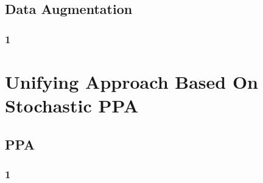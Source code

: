 \documentclass[aspectratio=169]{beamer}
\begin{document}
\subsection{Data Augmentation}
\begin{frame}
\frametitle{1}
\end{frame}

\section{Unifying Approach Based On Stochastic PPA}
\subsection{PPA}
\begin{frame}
\frametitle{1}
\end{frame}
\end{document}
